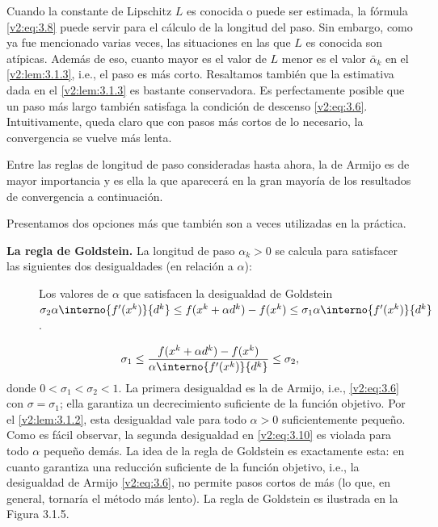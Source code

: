 Cuando la constante de Lipschitz $L$ es conocida o puede ser estimada, la fórmula \eqref{v2:eq:3.8} puede servir para el cálculo de la longitud del paso. Sin embargo, como ya fue mencionado varias veces, las situaciones en las que $L$ es conocida son atípicas. Además de eso, cuanto mayor es el valor de $L$ menor es el valor $\bar{\alpha}_k$ en el \cref{v2:lem:3.1.3}, i.e., el paso es más corto. Resaltamos también que la estimativa dada en el \cref{v2:lem:3.1.3} es bastante conservadora. Es perfectamente posible que un paso más largo también satisfaga la condición de descenso \eqref{v2:eq:3.6}. Intuitivamente, queda claro que con pasos más cortos de lo necesario, la convergencia se vuelve más lenta.

Entre las reglas de longitud de paso consideradas hasta ahora, la de Armijo es de mayor importancia y es ella la que aparecerá en la gran mayoría de los resultados de convergencia a continuación.

Presentamos dos opciones más que también son a veces utilizadas en la práctica.

\textbf{La regla de Goldstein.} La longitud de paso $\alpha_k > 0$ se calcula para satisfacer las siguientes dos desigualdades (en relación a $\alpha$):

\begin{figure}[htpb]
    \centering
    \caption{Los valores de $\alpha$ que satisfacen la desigualdad de Goldstein $\sigma_2 \alpha \interno{f'(x^k)}{d^k} \le f(x^k + \alpha d^k) - f(x^k) \le \sigma_1 \alpha \interno{f'(x^k)}{d^k}$.}
    \label{v2:fig:3.1.5}
\end{figure}

\begin{equation}
    \sigma_1 \le \frac{f(x^k + \alpha d^k) - f(x^k)}{\alpha \interno{f'(x^k)}{d^k}} \le \sigma_2,
    \label{v2:eq:3.10}
\end{equation}
donde $0 < \sigma_1 < \sigma_2 < 1$. La primera desigualdad es la de Armijo, i.e., \eqref{v2:eq:3.6} con $\sigma = \sigma_1$; ella garantiza un decrecimiento suficiente de la función objetivo. Por el \cref{v2:lem:3.1.2}, esta desigualdad vale para todo $\alpha > 0$ suficientemente pequeño. Como es fácil observar, la segunda desigualdad en \eqref{v2:eq:3.10} es violada para todo $\alpha$ pequeño demás. La idea de la regla de Goldstein es exactamente esta: en cuanto garantiza una reducción suficiente de la función objetivo, i.e., la desigualdad de Armijo \eqref{v2:eq:3.6}, no permite pasos cortos de más (lo que, en general, tornaría el método más lento). La regla de Goldstein es ilustrada en la Figura 3.1.5.

